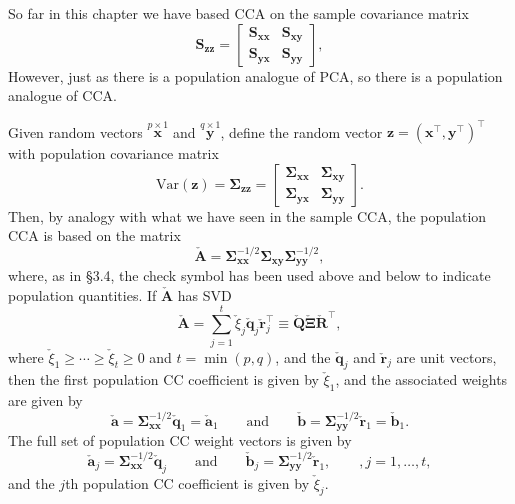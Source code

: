 \documentclass[]{book}
\theoremstyle{definition}
\theoremstyle{definition}
\theoremstyle{definition}
\theoremstyle{remark}
\begin{document}
So far in this chapter we have based CCA on the sample covariance matrix
\[
\boldsymbol S_{\boldsymbol z\boldsymbol z}=\left [\begin{array}{cc}
\boldsymbol S_{\boldsymbol x\boldsymbol x} & \boldsymbol S_{\boldsymbol x\boldsymbol y}\\
\boldsymbol S_{\boldsymbol y\boldsymbol x} & \boldsymbol S_{\boldsymbol y\boldsymbol y} \end{array} \right ],
\]
However, just as there is a population analogue of PCA, so there is a population analogue of CCA.

Given random vectors \(\stackrel{p \times 1}{\boldsymbol x}\) and \(\stackrel{q \times 1}{\boldsymbol y}\), define the random vector \(\boldsymbol z=(\boldsymbol x^\top, \boldsymbol y^\top)^\top\) with population covariance matrix
\[
\text{Var}(\boldsymbol z)=\boldsymbol \Sigma_{\boldsymbol z\boldsymbol z}=\left [\begin{array}{cc}
\boldsymbol \Sigma_{\boldsymbol x\boldsymbol x} & \boldsymbol \Sigma_{\boldsymbol x\boldsymbol y}\\
\boldsymbol \Sigma_{\boldsymbol y\boldsymbol x} & \boldsymbol \Sigma_{\boldsymbol y\boldsymbol y} \end{array} \right ].
\]
Then, by analogy with what we have seen in the sample CCA, the population CCA is based on the
matrix
\[
\check{\boldsymbol A}=\boldsymbol \Sigma_{\boldsymbol x\boldsymbol x}^{-1/2}\boldsymbol \Sigma_{\boldsymbol x\boldsymbol y}\boldsymbol \Sigma_{\boldsymbol y\boldsymbol y}^{-1/2},
\]
where, as in \S 3.4, the check symbol has been used above and below to indicate population quantities.
If \(\check{\boldsymbol A}\) has SVD
\[
\check{\boldsymbol A}=\sum_{j=1}^t \check{\xi}_j\check {\mathbf q}_j \check{\mathbf r}_j^\top \equiv \check{\mathbf Q}\check{\pmb \Xi} \check{\mathbf R}^\top,
\]
where \(\check{\xi}_1 \geq \cdots \geq \check{\xi}_t \geq 0\) and \(t=\min(p,q)\), and the \(\check{\boldsymbol q}_j\) and \(\check{\mathbf r}_j\) are unit vectors, then the first population CC coefficient is given by \(\check{\xi}_1\),
and the associated weights are given by
\[
\check{\boldsymbol a}=\boldsymbol \Sigma_{\boldsymbol x\boldsymbol x}^{-1/2}\check{\boldsymbol q}_1=\check{\boldsymbol a}_1 \qquad \text{and} \qquad \check{\boldsymbol b}=\boldsymbol \Sigma_{\boldsymbol y\boldsymbol y}^{-1/2}\check{\mathbf r}_1=\check{\boldsymbol b}_1.
\]
The full set of population CC weight vectors is given by
\[
\check{\boldsymbol a}_j =\boldsymbol \Sigma_{\boldsymbol x\boldsymbol x}^{-1/2}\check{\boldsymbol q}_j \qquad \text{and} \qquad
\check{\boldsymbol b}_j=\boldsymbol \Sigma_{\boldsymbol y\boldsymbol y}^{-1/2}\check{\mathbf r}_1, \qquad , j=1, \ldots , t,
\]
and the \(j\)th population CC coefficient is given by \(\check{\xi}_j\).
\end{document}
